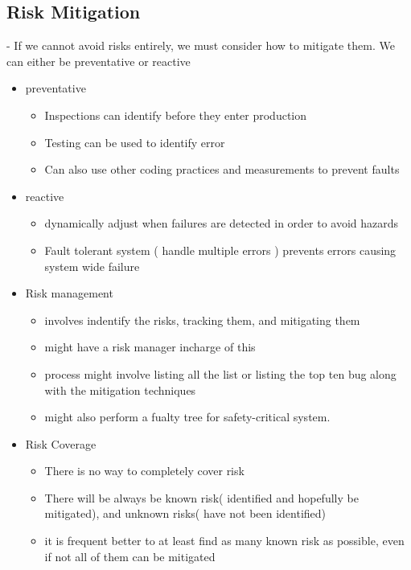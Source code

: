 \documentclass{article}
\begin{document}
 \subsection{Risk Mitigation}
 - If we cannot avoid risks entirely, we must consider how to mitigate them. We
 can either be preventative or reactive
 \begin{itemize}
   \item preventative
   \begin{itemize}
     \item Inspections can identify before they enter production
     \item Testing can be used to identify error
     \item Can also use other coding practices and measurements to prevent
     faults
   \end{itemize}
   \item reactive
   \begin{itemize}
     \item dynamically adjust when failures are detected in order to avoid
     hazards
     \item Fault tolerant system ( handle multiple errors ) prevents errors
     causing system wide failure
   \end{itemize}
   \item Risk management
   \begin{itemize}
     \item involves indentify the risks, tracking them, and mitigating them
     \item might have a risk manager incharge of this
     \item process might involve listing all the list or  listing the top ten
     bug along with the mitigation techniques
     \item might also perform a fualty tree for safety-critical  system.
   \end{itemize}
  
   \item Risk Coverage
   \begin{itemize}
     \item There is no way to completely cover risk
     \item There will be always be known risk( identified and hopefully be
     mitigated), and unknown risks( have not been identified)
     \item it is frequent better to at least find as many known risk as
     possible, even if not all of them can be mitigated
   \end{itemize}
 
 \end{itemize}
 
\end{document}
